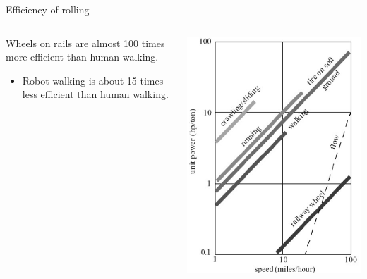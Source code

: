 \documentclass[compress]{beamer}
\begin{document}
\begin{frame}{Efficiency of rolling}
    \begin{columns}
        \begin{column}{0.5\linewidth}
            Wheels on rails are almost 100 times more efficient than human walking.

            \begin{itemize}
                \item Robot walking is about 15 times less efficient than human walking.
            \end{itemize}

        \end{column}
        \begin{column}{0.5\linewidth}

            \begin{center}
                \includegraphics[width=0.8\linewidth]{rolling}
            \end{center}
        \end{column}
    \end{columns}
\end{frame}
\end{document}
